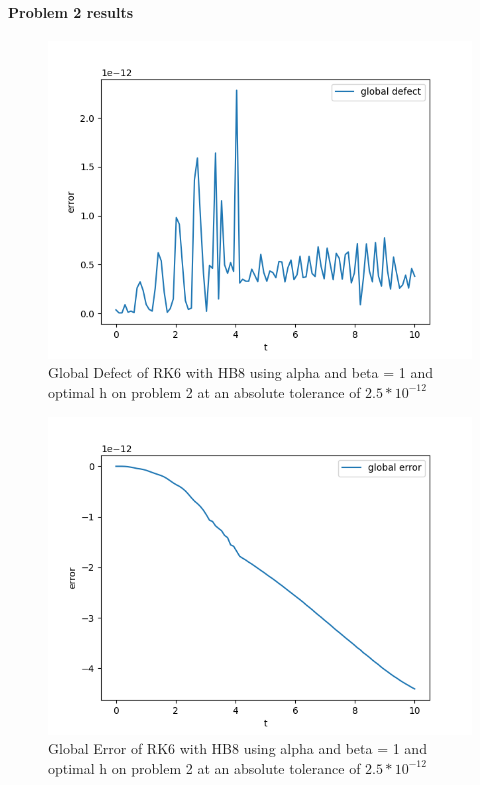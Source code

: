 \documentclass{article}
\begin{document}
\paragraph{Problem 2 results}
\begin{figure}[H]
\centering
\includegraphics[width=0.7\linewidth]{./figures/sharp_tolerance_rk6_with_hb8_p2_global_defect}
\caption{Global Defect of RK6 with HB8 using alpha and beta = 1 and optimal h on problem 2 at an absolute tolerance of $2.5*10^{-12}$}
\label{fig:sharp_tolerance_rk6_with_hb8_p2_global_defect}
\end{figure}

\begin{figure}[H]
\centering
\includegraphics[width=0.7\linewidth]{./figures/sharp_tolerance_rk6_with_hb8_p2_global_error}
\caption{Global Error of RK6 with HB8 using alpha and beta = 1 and optimal h on problem 2 at an absolute tolerance of $2.5*10^{-12}$}
\label{fig:sharp_tolerance_rk6_with_hb8_p2_global_error}
\end{figure}
\end{document}
